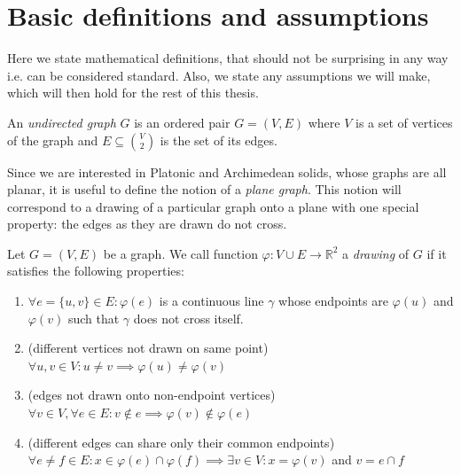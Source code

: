 
\section{Basic definitions and assumptions}

Here we state mathematical definitions, that should not be surprising in any way i.e. can be considered standard. Also, we state any assumptions we will make, which will then hold for the rest of this thesis.

\begin{definition}
    An \textit{undirected graph} $G$ is an ordered pair $G=(V,E)$ where $V$ is a set of vertices of the graph and $E \subseteq \binom{V}{2}$ is the set of its edges. 
\end{definition}

Since we are interested in Platonic and Archimedean solids, whose graphs are all planar, it is useful to define the notion of a \textit{plane graph}. This notion will correspond to a drawing of a particular graph onto a plane with one special property: the edges as they are drawn do not cross.

\begin{definition}
    Let $G=(V,E)$ be a graph. We call function $\varphi : V \cup E \rightarrow \mathbb{R}^2$ a \textit{drawing} of $G$ if it satisfies the following properties:
    \begin{enumerate}
    
        \item $\forall e=\{u,v\} \in E : \varphi(e)$ is a continuous line $\gamma$ whose endpoints are $\varphi(u)$ and $\varphi(v)$ such that $\gamma$ does not cross itself.
        
        \item (different vertices not drawn on same point) \\ $\forall u,v \in V : u \neq v \implies \varphi(u) \neq \varphi(v)$
        
        \item (edges not drawn onto non-endpoint vertices) \\ $\forall v \in V, \forall e \in E: v \notin e \implies \varphi(v) \notin \varphi(e)$
        
        \item (different edges can share only their common endpoints) \\ $\forall e \neq f \in E : x \in \varphi(e) \cap \varphi(f) \implies \exists v \in V: x = \varphi(v)$ and $v = e \cap f$
    \end{enumerate}
\end{definition}

